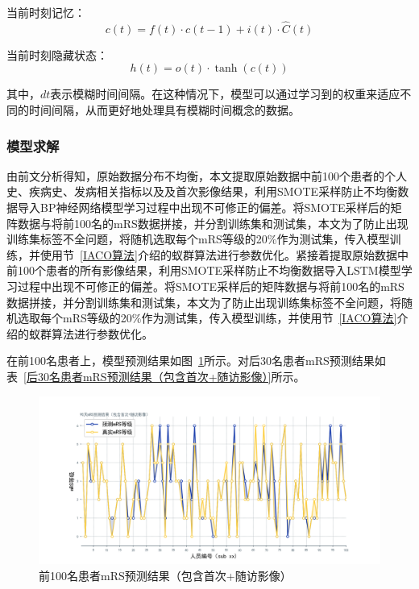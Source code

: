 \documentclass[bwprint]{gmcmthesis}
\begin{document}
当前时刻记忆：
\begin{equation}
c(t) = f(t) \cdot c(t-1) + i(t) \cdot \hat{C}(t)
\end{equation}

当前时刻隐藏状态：
\begin{equation}
h(t) = o(t) \cdot \tanh(c(t))
\end{equation}

其中，$dt$表示模糊时间间隔。在这种情况下，模型可以通过学习到的权重来适应不同的时间间隔，从而更好地处理具有模糊时间概念的数据。



\subsubsection{模型求解}


由前文分析得知，原始数据分布不均衡，本文提取原始数据中前100个患者的个人史、疾病史、发病相关指标以及及首次影像结果，利用SMOTE采样防止不均衡数据导入BP神经网络模型学习过程中出现不可修正的偏差。将SMOTE采样后的矩阵数据与将前100名的mRS数据拼接，并分割训练集和测试集，本文为了防止出现训练集标签不全问题，将随机选取每个mRS等级的20\%作为测试集，传入模型训练，并使用节~\ref{IACO算法}介绍的蚁群算法进行参数优化。紧接着提取原始数据中前100个患者的所有影像结果，利用SMOTE采样防止不均衡数据导入LSTM模型学习过程中出现不可修正的偏差。将SMOTE采样后的矩阵数据与将前100名的mRS数据拼接，并分割训练集和测试集，本文为了防止出现训练集标签不全问题，将随机选取每个mRS等级的20\%作为测试集，传入模型训练，并使用节~\ref{IACO算法}介绍的蚁群算法进行参数优化。

在前100名患者上，模型预测结果如图~\ref{前100名患者mRS预测结果（包含首次+随访影像）}所示。对后30名患者mRS预测结果如表~\ref{后30名患者mRS预测结果（包含首次+随访影像）}所示。

\begin{figure}[h] %
  \centering %
  \includegraphics[width=\textwidth]{fig_me/90天mRS预测结果（包含首次+随访影像）.png}
  \caption{前100名患者mRS预测结果（包含首次+随访影像）}
  \label{前100名患者mRS预测结果（包含首次+随访影像）}
\end{figure}
\end{document}
